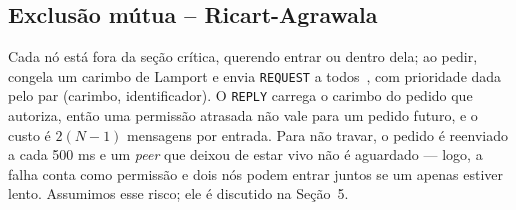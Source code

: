 \subsection{Exclus\~ao m\'utua -- Ricart-Agrawala}

Cada nó está fora da seção crítica, querendo entrar ou dentro dela; ao pedir, congela um carimbo
de Lamport e envia \texttt{REQUEST} a todos~\cite{ricart81}, com prioridade dada pelo par (carimbo,
identificador). O \texttt{REPLY} carrega o carimbo do pedido que autoriza, então uma permissão
atrasada não vale para um pedido futuro, e o custo é $2(N-1)$ mensagens por entrada. Para não
travar, o pedido é reenviado a cada 500 ms e um \textit{peer} que deixou de estar vivo não é
aguardado --- logo, a falha conta como permissão e dois nós podem entrar juntos se um apenas
estiver lento. Assumimos esse risco; ele é discutido na Seção~5.
